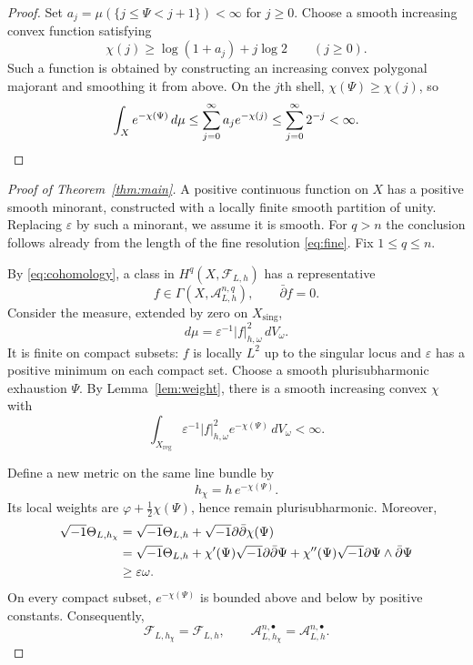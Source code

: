 \documentclass[11pt,a4paper,reqno]{amsart}
\theoremstyle{definition}
\theoremstyle{remark}
\numberwithin{equation}{section}
\newcommand{\FF}{\mathcal F}
\newcommand{\scrA}{\mathscr A}
\newcommand{\reg}{\mathrm{reg}}
\newcommand{\sing}{\mathrm{sing}}
\newcommand{\db}{\bar\partial}
\newcommand{\ii}{\sqrt{-1}}
\newcommand{\dV}{\,dV_\omega}
\begin{document}
\begin{proof}
Set $a_j=\mu(\{j\leq\Psi<j+1\})<\infty$ for $j\geq0$. Choose a smooth
increasing convex function satisfying
\[
 \chi(j)\geq\log(1+a_j)+j\log2\qquad(j\geq0).
\]
Such a function is obtained by constructing an increasing convex
polygonal majorant and smoothing it from above. On the $j$th shell,
$\chi(\Psi)\geq\chi(j)$, so
\[
 \int_X e^{-\chi(\Psi)}\,d\mu
 \leq\sum_{j=0}^\infty a_j e^{-\chi(j)}
 \leq\sum_{j=0}^\infty 2^{-j}<\infty.
 \qedhere
\]
\end{proof}

\begin{proof}[Proof of Theorem~\ref{thm:main}]
A positive continuous function on $X$ has a positive smooth minorant,
constructed with a locally finite smooth partition of unity. Replacing
$\varepsilon$ by such a minorant, we assume it is smooth.
For $q>n$ the conclusion follows already from the length of the fine
resolution \eqref{eq:fine}. Fix $1\leq q\leq n$.

By \eqref{eq:cohomology}, a class in $H^q(X,\FF_{L,h})$ has a
representative
\[
 f\in\Gamma(X,\scrA^{n,q}_{L,h}),\qquad\db f=0.
\]
Consider the measure, extended by zero on $X_{\sing}$,
\[
 d\mu=\varepsilon^{-1}|f|_{h,\omega}^2\,dV_\omega.
\]
It is finite on compact subsets: $f$ is locally $L^2$ up to the singular
locus and $\varepsilon$ has a positive minimum on each compact set.
Choose a smooth plurisubharmonic exhaustion $\Psi$. By
Lemma~\ref{lem:weight}, there is a smooth increasing convex $\chi$ with
\begin{equation}\label{eq:weightedfinite}
 \int_{X_{\reg}}\varepsilon^{-1}|f|_{h,\omega}^2
                          e^{-\chi(\Psi)}\dV<\infty.
\end{equation}

Define a new metric on the same line bundle by
\[
 h_\chi=h\,e^{-\chi(\Psi)}.
\]
Its local weights are $\varphi+\tfrac12\chi(\Psi)$, hence remain
plurisubharmonic. Moreover,
\begin{align}
 \ii\Theta_{L,h_\chi}
 &=\ii\Theta_{L,h}+\ii\partial\db\chi(\Psi)\notag\\
 &=\ii\Theta_{L,h}
   +\chi'(\Psi)\ii\partial\db\Psi
   +\chi''(\Psi)\ii\partial\Psi\wedge\db\Psi\notag\\
 &\geq\varepsilon\omega.
 \label{eq:weightedcurvature}
\end{align}
On every compact subset, $e^{-\chi(\Psi)}$ is bounded above and below by
positive constants. Consequently,
\begin{equation}\label{eq:same-sheaves}
 \FF_{L,h_\chi}=\FF_{L,h},
 \qquad
 \scrA^{n,\bullet}_{L,h_\chi}=\scrA^{n,\bullet}_{L,h}.
\end{equation}


\end{proof}
\end{document}
